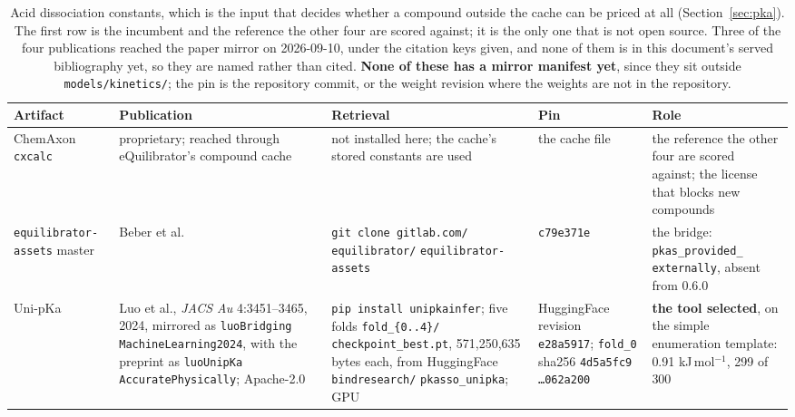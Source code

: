 \begin{table}[!htbp]
  \centering
  \footnotesize
  \caption[p$K_a$ sources]{Acid dissociation constants, which is the input that decides
  whether a compound outside the cache can be priced at all (Section~\ref{sec:pka}). The
  first row is the incumbent and the reference the other four are scored against; it is
  the only one that is not open source. Three of the four publications reached the paper
  mirror on 2026-09-10, under the citation keys given, and none of them is in this
  document's served bibliography yet, so they are named rather than cited. \textbf{None of
  these has a mirror manifest yet}, since they sit outside \texttt{models/kinetics/}; the
  pin is the repository commit, or the weight revision where the weights are not in the
  repository.}
  \label{tab:papers-pka}
  \begin{tabular}{@{}p{}p{}p{}p{}p{}@{}}
    \hline
    Artifact & Publication & Retrieval & Pin & Role \\
    \hline
    ChemAxon \texttt{cxcalc} & proprietary; reached through eQuilibrator's compound cache &
      not installed here; the cache's stored constants are used & the cache file &
      the reference the other four are scored against; the license that blocks new
      compounds \\
    \texttt{equilibrator-} \texttt{assets} master &
      Beber et al.~\cite{beberEQuilibrator30Database2022} &
      \texttt{git clone gitlab.com/} \texttt{equilibrator/} \texttt{equilibrator-assets} &
      \texttt{c79e371e} &
      the bridge: \texttt{pkas\_provided\_} \texttt{externally}, absent from 0.6.0 \\
    Uni-pKa & Luo et al., \emph{JACS Au} 4:3451--3465, 2024, mirrored as
      \texttt{luoBridging} \texttt{MachineLearning2024}, with the preprint as
      \texttt{luoUnipKa} \texttt{AccuratePhysically}; Apache-2.0 &
      \texttt{pip install unipkainfer}; five folds
      \texttt{fold\_\{0..4\}/} \texttt{checkpoint\_best.pt},
      571{,}250{,}635 bytes each, from HuggingFace
      \texttt{bindresearch/} \texttt{pkasso\_unipka}; GPU &
      HuggingFace revision \texttt{e28a5917}; \texttt{fold\_0} sha256
      \texttt{4d5a5fc9} \texttt{\ldots062a200} &
      \textbf{the tool selected}, on the simple enumeration template:
      0.91 kJ\,mol$^{-1}$, 299 of 300 \\

\end{tabular}
\end{table}
